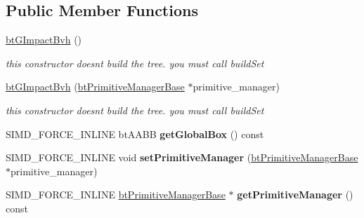 \subsection*{Public Member Functions}
\begin{DoxyCompactItemize}
\item 
\mbox{\label{classbtGImpactBvh_ab305fcdbd3faf585e253433b7193587e}} 
\hyperlink{classbtGImpactBvh_ab305fcdbd3faf585e253433b7193587e}{bt\+G\+Impact\+Bvh} ()
\begin{DoxyCompactList}\small\item\em this constructor doesn\textquotesingle{}t build the tree. you must call build\+Set \end{DoxyCompactList}\item 
\mbox{\label{classbtGImpactBvh_afbb8405cc5348fc66dc09819bfc60969}} 
\hyperlink{classbtGImpactBvh_afbb8405cc5348fc66dc09819bfc60969}{bt\+G\+Impact\+Bvh} (\hyperlink{classbtPrimitiveManagerBase}{bt\+Primitive\+Manager\+Base} $\ast$primitive\+\_\+manager)
\begin{DoxyCompactList}\small\item\em this constructor doesn\textquotesingle{}t build the tree. you must call build\+Set \end{DoxyCompactList}\item 
\mbox{\label{classbtGImpactBvh_afe0fef20aaf1e694662c7d04b8b8b1e8}} 
S\+I\+M\+D\+\_\+\+F\+O\+R\+C\+E\+\_\+\+I\+N\+L\+I\+NE bt\+A\+A\+BB {\bfseries get\+Global\+Box} () const
\item 
\mbox{\label{classbtGImpactBvh_a9bf61ff1769af089dd53e2f1a78c8ef8}} 
S\+I\+M\+D\+\_\+\+F\+O\+R\+C\+E\+\_\+\+I\+N\+L\+I\+NE void {\bfseries set\+Primitive\+Manager} (\hyperlink{classbtPrimitiveManagerBase}{bt\+Primitive\+Manager\+Base} $\ast$primitive\+\_\+manager)
\item 
\mbox{\label{classbtGImpactBvh_a9c34d5bc31bb61f969de2aa6868e015e}} 
S\+I\+M\+D\+\_\+\+F\+O\+R\+C\+E\+\_\+\+I\+N\+L\+I\+NE \hyperlink{classbtPrimitiveManagerBase}{bt\+Primitive\+Manager\+Base} $\ast$ {\bfseries get\+Primitive\+Manager} () const
\item 
\mbox{\label{classbtGImpactBvh_ab305fcdbd3faf585e253433b7193587e}} 

\end{DoxyCompactItemize}
